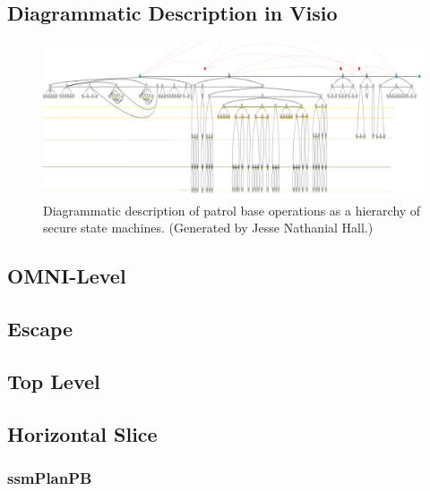 \documentclass[../../main/main.tex]{subfiles}
\begin{document}
\subsection{Diagrammatic Description in Visio}\label{ssec:overalldiagram}
\begin{figure}[t]
\includegraphics[width=\textwidth]{../figures/overalldiagramsquashed.png}
\caption{Diagrammatic description of patrol base operations as a hierarchy of secure state machines.  (Generated by Jesse Nathanial Hall.)}
\end{figure}

\subsection{OMNI-Level}\label{ssec:omnilevel}

\subsection{Escape}\label{ssec:escape}

\subsection{Top Level}\label{ssec:toplevel}

\subsection{Horizontal Slice}\label{ssec:horizontalslice}

\subsubsection{ssmPlanPB}\label{sssec:ssmPlanPB}
\end{document}
